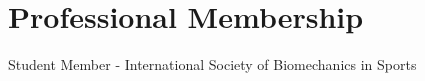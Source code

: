 \documentclass[../main.tex]{subfiles}
\begin{document}
\section{Professional Membership}
  \vspace{3pt}
  \resumeSubHeadingListStart   
    \item Student Member - International Society of Biomechanics in Sports
  \resumeSubHeadingListEnd
\end{document}
